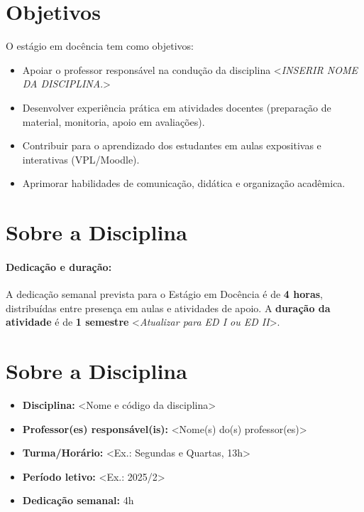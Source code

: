 \documentclass[12pt, a4paper]{article}
\begin{document}
\maketitle

\section{Objetivos} \label{sec:objetivos} %

O estágio em docência tem como objetivos:

\begin{itemize}
    \item Apoiar o professor responsável na condução da disciplina <\textit{INSERIR NOME DA DISCIPLINA}.>
    \item Desenvolver experiência prática em atividades docentes (preparação de material, monitoria, apoio em avaliações).
    \item Contribuir para o aprendizado dos estudantes em aulas expositivas e interativas (VPL/Moodle).
    \item Aprimorar habilidades de comunicação, didática e organização acadêmica.
\end{itemize}

\section{Sobre a Disciplina} \label{sec:disciplina} %

\paragraph{Dedicação e duração:}A dedicação semanal prevista para o Estágio em Docência é de \textbf{4 horas}, distribuídas entre presença em aulas e atividades de apoio. A \textbf{duração da atividade} é de \textbf{1 semestre} <\textit{Atualizar para ED I ou ED II}>.

\section{Sobre a Disciplina} \label{sec:disciplina}


\begin{itemize}
    \item \textbf{Disciplina:} <Nome e código da disciplina>
    \item \textbf{Professor(es) responsável(is):} <Nome(s) do(s) professor(es)>
    \item \textbf{Turma/Horário:} <Ex.: Segundas e Quartas, 13h>
    \item \textbf{Período letivo:} <Ex.: 2025/2>
    \item \textbf{Dedicação semanal:} 4h
\end{itemize}
\end{document}
